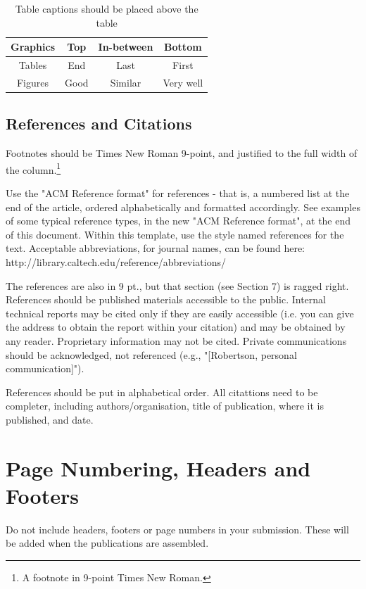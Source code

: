 \documentclass[acmtog, authorversion]{acmart}
\begin{document}
\begin{table}
\centering \caption{Table captions should be placed above the table}
\begin{tabular}{|c|c|c|c|} \hline
\textbf{Graphics} & \textbf{Top} & \textbf{In-between} & \textbf{Bottom}\\ \hline 
Tables&End&Last&First\\ \hline 
Figures&Good&Similar&Very well\\
\hline\end{tabular}
\end{table}

\subsection{References and Citations}
Footnotes should be Times New Roman 9-point, and justified to the 
full width of the column.\footnote{A footnote in 9-point Times New Roman.}

Use the "ACM Reference format" for references - that is, a numbered 
list at the end of the article, ordered alphabetically and formatted 
accordingly. See examples of some typical reference types, in the new 
"ACM Reference format", at the end of this document. Within this 
template, use the style named references for the text. Acceptable 
abbreviations, for journal names, can be found here: 
http://library.caltech.edu/reference/abbreviations/

The references are also in 9 pt., but that section (see Section 7) is 
ragged right. References should be published materials accessible to 
the public. Internal technical reports may be cited only if they are 
easily accessible (i.e. you can give the address to obtain the report 
within your citation) and may be obtained by any reader. Proprietary
information may not be cited. Private communications should be 
acknowledged, not referenced  (e.g., "[Robertson, personal communication]"). 

References should be put in alphabetical order. All citattions need to be completer, including authors/organisation, title of publication, where it is published, and date.

\section{Page Numbering, Headers and Footers}
Do not include headers, footers or page numbers in your submission. 
These will be added when the publications are assembled.
\end{document}
